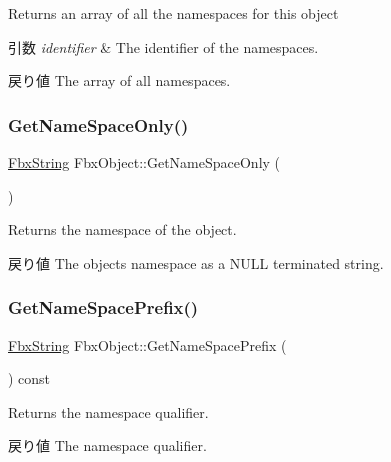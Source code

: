 Returns an array of all the namespaces for this object 
\begin{DoxyParams}{引数}
{\em identifier} & The identifier of the namespaces. \\
\hline
\end{DoxyParams}
\begin{DoxyReturn}{戻り値}
The array of all namespaces. 
\end{DoxyReturn}
\mbox{\label{class_fbx_object_a9cc9873c1d66722b964c04da5ec2001f}} 
\subsubsection{\texorpdfstring{Get\+Name\+Space\+Only()}{GetNameSpaceOnly()}}
{\footnotesize\ttfamily \hyperlink{class_fbx_string}{Fbx\+String} Fbx\+Object\+::\+Get\+Name\+Space\+Only (\begin{DoxyParamCaption}{ }\end{DoxyParamCaption})}

Returns the namespace of the object. \begin{DoxyReturn}{戻り値}
The object\textquotesingle{}s namespace as a {\ttfamily N\+U\+LL} terminated string. 
\end{DoxyReturn}
\mbox{\label{class_fbx_object_a8a0b08d810c3451ea912840caab53694}} 
\subsubsection{\texorpdfstring{Get\+Name\+Space\+Prefix()}{GetNameSpacePrefix()}}
{\footnotesize\ttfamily \hyperlink{class_fbx_string}{Fbx\+String} Fbx\+Object\+::\+Get\+Name\+Space\+Prefix (\begin{DoxyParamCaption}{ }\end{DoxyParamCaption}) const}

Returns the namespace qualifier. \begin{DoxyReturn}{戻り値}
The namespace qualifier. 
\end{DoxyReturn}
\mbox{\label{class_fbx_object_a9caa594f866ea3a424f5f6e3676e2799}} 
